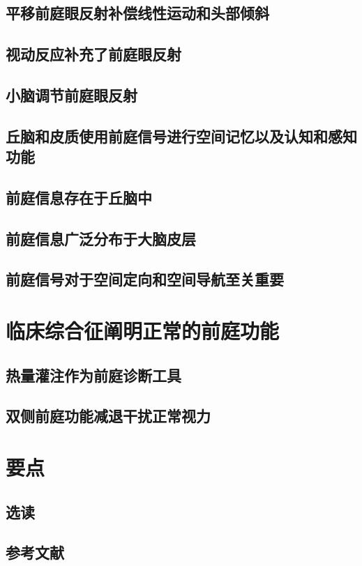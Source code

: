 \subsection{平移前庭眼反射补偿线性运动和头部倾斜}
\subsection{视动反应补充了前庭眼反射}
\subsection{小脑调节前庭眼反射}
\subsection{丘脑和皮质使用前庭信号进行空间记忆以及认知和感知功能}
\subsection{前庭信息存在于丘脑中}
\subsection{前庭信息广泛分布于大脑皮层}
\subsection{前庭信号对于空间定向和空间导航至关重要}


\section{临床综合征阐明正常的前庭功能}
\subsection{热量灌注作为前庭诊断工具}
\subsection{双侧前庭功能减退干扰正常视力}

\section{要点}
\subsection{选读}
\subsection{参考文献}

